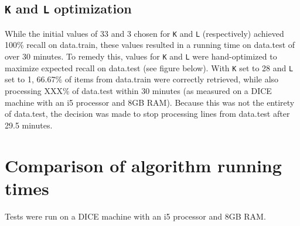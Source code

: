 \documentclass{article}
\begin{document}
\subsection{\texttt{K} and \texttt{L} optimization}
While the initial values of 33 and 3 chosen for \texttt{K} and \texttt{L} (respectively) achieved 100\% recall on data.train, these values resulted in a running time on data.test of over 30 minutes. To remedy this, values for \texttt{K} and \texttt{L} were hand-optimized to maximize expected recall on data.test (see figure below). With \texttt{K} set to 28 and \texttt{L} set to 1, 66.67\% of items from data.train were correctly retrieved, while also processing XXX\% of data.test within 30 minutes (as measured on a DICE machine with an i5 processor and 8GB RAM). Because this was not the entirety of data.test, the decision was made to stop processing lines from data.test after 29.5 minutes.

\section{Comparison of algorithm running times}
Tests were run on a DICE machine with an i5 processor and 8GB RAM.
%
\end{document}

